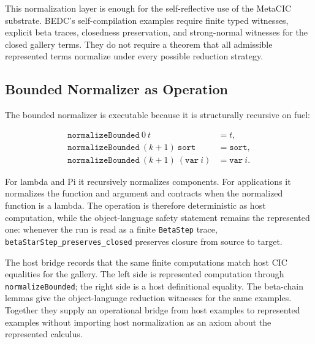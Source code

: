 This normalization layer is enough for the self-reflective use of the
MetaCIC substrate.  BEDC's self-compilation examples require finite typed
witnesses, explicit beta traces, closedness preservation, and strong-normal
witnesses for the closed gallery terms.  They do not require a theorem that
all admissible represented terms normalize under every possible reduction
strategy.

\subsection{Bounded Normalizer as Operation}
\label{subsec:closed-term-bounded-normalizer-operation}

The bounded normalizer is executable because it is structurally recursive on
fuel:

$$
\begin{aligned}
  \texttt{normalizeBounded}\ 0\ t &= t,\\
  \texttt{normalizeBounded}\ (k+1)\ \texttt{sort} &= \texttt{sort},\\
  \texttt{normalizeBounded}\ (k+1)\ (\texttt{var}\ i) &= \texttt{var}\ i.
\end{aligned}
$$

For lambda and Pi it recursively normalizes components.  For applications it
normalizes the function and argument and contracts when the normalized
function is a lambda.  The operation is therefore deterministic as host
computation, while the object-language safety statement remains the
represented one: whenever the run is read as a finite \texttt{BetaStep} trace,
\texttt{betaStarStep\_preserves\_closed} preserves closure from source to
target.

The host bridge records that the same finite computations match host CIC
equalities for the gallery.  The left side is represented computation through
\texttt{normalizeBounded}; the right side is a host definitional equality.
The beta-chain lemmas give the object-language reduction witnesses for the
same examples.  Together they supply an operational bridge from host examples
to represented examples without importing host normalization as an axiom about
the represented calculus.


